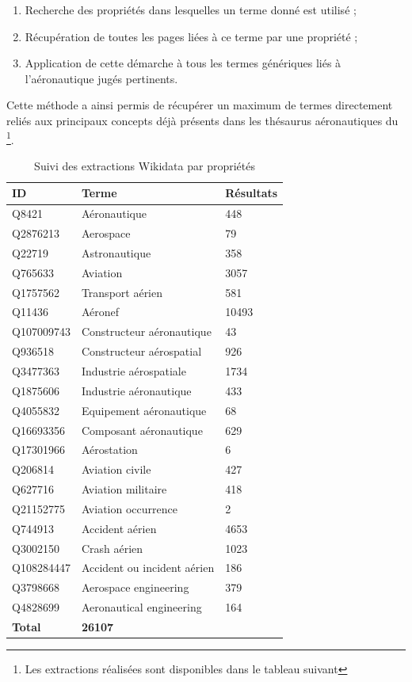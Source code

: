 \begin{enumerate}
	\item Recherche des propriétés dans lesquelles un terme donné est utilisé ;
	\item Récupération de toutes les pages liées à ce terme par une propriété ;
	\item Application de cette démarche à tous les termes génériques liés à l'aéronautique jugés pertinents.
\end{enumerate}

Cette méthode a ainsi permis de récupérer un maximum de termes directement reliés aux principaux concepts déjà présents dans les thésaurus aéronautiques du \mae\footnote{Les extractions réalisées sont disponibles dans le tableau suivant }.


\begin{table}[htbp]
	\centering
	\begin{tabular}{lll}
		\toprule
		\textbf{ID} & \textbf{Terme} & \textbf{Résultats}\\
		\midrule
		Q8421 & Aéronautique & 448 \\
		Q2876213 & Aerospace & 79  \\
		Q22719 & Astronautique & 358  \\
		Q765633 & Aviation & 3057  \\
		Q1757562 & Transport aérien & 581\\
		Q11436 & Aéronef & 10493 \\
		Q107009743 & Constructeur aéronautique & 43  \\
		Q936518 & Constructeur aérospatial & 926 \\
		Q3477363 & Industrie aérospatiale & 1734\\
		Q1875606 & Industrie aéronautique & 433 \\
		Q4055832 & Equipement aéronautique & 68 \\
		Q16693356 & Composant aéronautique & 629 \\
		Q17301966 & Aérostation & 6 \\
		Q206814 & Aviation civile & 427 \\
		Q627716 & Aviation militaire & 418 \\
		Q21152775 & Aviation occurrence & 2 \\
		Q744913 & Accident aérien & 4653 \\
		Q3002150 & Crash aérien & 1023  \\
		Q108284447 & Accident ou incident aérien & 186 \\
		Q3798668 & Aerospace engineering & 379  \\
		Q4828699 & Aeronautical engineering & 164 \\
		\midrule
		\textbf{Total} & \textbf{26107} & \\
		\bottomrule
	\end{tabular}
	\caption{Suivi des extractions Wikidata par propriétés}
	\label{tab:wikidata}
\end{table}

